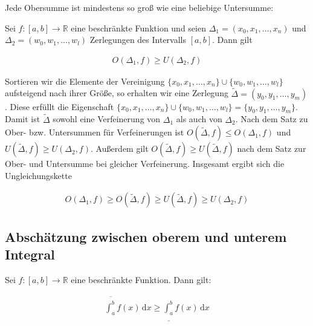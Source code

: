 \documentclass[fontsize=9pt,
               parskip=half-,
               DIV=14,
               listof=chapterentry,
               tocflat]{scrbook}
\begin{document}
Jede Obersumme ist mindestens so groß wie eine beliebige Untersumme:

\begin{theorem*}
Sei $f:[a,b]\to \mathbb {R} $ eine beschränkte Funktion und seien $\Delta _{1}=(x_{0},x_{1},\ldots ,x_{n})$ und $\Delta _{2}=(w_{0},w_{1},\ldots ,w_{l})$ Zerlegungen des Intervalls $[a,b]$. Dann gilt

\begin{align*}
O(\Delta _{1},f)\geq U(\Delta _{2},f)
\end{align*}

\end{theorem*}

\begin{proof*}
Sortieren wir die Elemente der Vereinigung $\{x_{0},x_{1},\ldots ,x_{n}\}\cup \{w_{0},w_{1},\ldots ,w_{l}\}$ aufsteigend nach ihrer Größe, so erhalten wir eine Zerlegung ${\tilde {\Delta }}=(y_{0},y_{1},\ldots ,y_{m})$. Diese erfüllt die Eigenschaft $\{x_{0},x_{1},\ldots ,x_{n}\}\cup \{w_{0},w_{1},\ldots ,w_{l}\}=\{y_{0},y_{1},\ldots ,y_{m}\}$. Damit ist ${\tilde {\Delta }}$ sowohl eine Verfeinerung von $\Delta _{1}$ als auch von $\Delta _{2}$. Nach dem Satz zu Ober- bzw. Untersummen für Verfeinerungen ist $O({\tilde {\Delta }},f)\leq O(\Delta _{1},f)$ und $U({\tilde {\Delta }},f)\geq U(\Delta _{2},f)$. Außerdem gilt $O({\tilde {\Delta }},f)\geq U({\tilde {\Delta }},f)$ nach dem Satz zur Ober- und Untersumme bei gleicher Verfeinerung. Insgesamt ergibt sich die Ungleichungskette

\begin{align*}
O(\Delta _{1},f)\geq O({\tilde {\Delta }},f)\geq U({\tilde {\Delta }},f)\geq U(\Delta _{2},f)
\end{align*}

\end{proof*}

\subsection{Abschätzung zwischen oberem und unterem Integral}

\begin{theorem*}
Sei $f:[a,b]\to \mathbb {R} $ eine beschränkte Funktion. Dann gilt:

\begin{align*}
{\overline {\int _{a}^{b}}}f(x)\,\mathrm {d} x\geq {\underline {\int _{a}^{b}}}f(x)\,\mathrm {d} x
\end{align*}

\end{theorem*}
\end{document}
